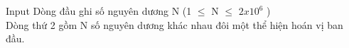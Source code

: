 Input
Dòng đầu ghi số nguyên dương N (1  $\le$  N  $\le$  $2x10^{6}$ )
\\Dòng thứ 2 gồm N số nguyên dương khác nhau đôi một thể hiện hoán vị ban đầu.